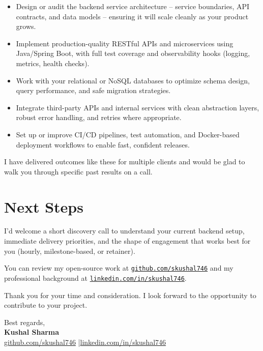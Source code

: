 \documentclass[11pt,letterpaper]{article}
\begin{document}
\begin{itemize}[leftmargin=0.3in, noitemsep, topsep=2pt, partopsep=0pt, parsep=1pt]
    \item Design or audit the backend service architecture -- service boundaries, API contracts, and data models -- ensuring it will scale cleanly as your product grows.
    \item Implement production-quality RESTful APIs and microservices using Java/Spring Boot, with full test coverage and observability hooks (logging, metrics, health checks).
    \item Work with your relational or NoSQL databases to optimize schema design, query performance, and safe migration strategies.
    \item Integrate third-party APIs and internal services with clean abstraction layers, robust error handling, and retries where appropriate.
    \item Set up or improve CI/CD pipelines, test automation, and Docker-based deployment workflows to enable fast, confident releases.
\end{itemize}

I have delivered outcomes like these for multiple clients and would be glad to walk you through specific past results on a call.

\section{Next Steps}

I'd welcome a short discovery call to understand your current backend setup, immediate delivery priorities, and the shape of engagement that works best for you (hourly, milestone-based, or retainer).

You can review my open-source work at \href{https://github.com/skushal746}{\texttt{github.com/skushal746}} and my professional background at \href{https://www.linkedin.com/in/skushal746}{\texttt{linkedin.com/in/skushal746}}.

Thank you for your time and consideration. I look forward to the opportunity to contribute to your project.

\vspace{1em}
Best regards,\\
\vspace{0.8em}
{\large \textbf{Kushal Sharma}}\\
\small \href{https://github.com/skushal746}{github.com/skushal746} \quad|\quad \href{https://www.linkedin.com/in/skushal746}{linkedin.com/in/skushal746}
\end{document}
